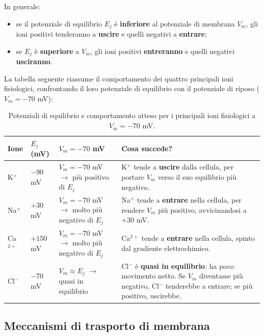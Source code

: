 \documentclass[12pt,a4paper,openany]{book}
\begin{document}
In generale:
\begin{itemize}
  \item se il potenziale di equilibrio $E_j$ è \textbf{inferiore} al potenziale
    di membrana $V_m$, gli ioni positivi tenderanno a \textbf{uscire} e quelli
    negativi a \textbf{entrare};
  \item se $E_j$ è \textbf{superiore} a $V_m$, gli ioni positivi
    \textbf{entreranno} e quelli negativi \textbf{usciranno}.
\end{itemize}

La tabella seguente riassume il comportamento dei quattro principali ioni
fisiologici, confrontando il loro potenziale di equilibrio con il potenziale
di riposo ($V_m = -70$ mV):

\begin{table}[H]
\centering
\renewcommand{\arraystretch}{1.5}
\begin{tabular}{p{2.5cm} p{2.5cm} p{2.5cm} p{6cm}}
\toprule
\textbf{Ione} & \textbf{$E_j$ (mV)} & \textbf{$V_m = -70$ mV} & \textbf{Cosa succede?} \\
\midrule
K$^+$ & $-90$ mV & $V_m = -70$ mV $\rightarrow$ più positivo di $E_j$ & 
K$^+$ tende a \textbf{uscire} dalla cellula, per portare $V_m$ verso il suo equilibrio più negativo. \\
\midrule
Na$^+$ & $+30$ mV & $V_m = -70$ mV $\rightarrow$ molto più negativo di $E_j$ & 
Na$^+$ tende a \textbf{entrare} nella cellula, per rendere $V_m$ più positivo, avvicinandosi a $+30$ mV. \\
\midrule
Ca$^{2+}$ & $+150$ mV & $V_m = -70$ mV $\rightarrow$ molto più negativo di $E_j$ & 
Ca$^{2+}$ tende a \textbf{entrare} nella cellula, spinto dal gradiente elettrochimico. \\
\midrule
Cl$^-$ & $-70$ mV & $V_m \approx E_j$ $\rightarrow$ quasi in equilibrio & 
Cl$^-$ è \textbf{quasi in equilibrio}: ha poco movimento netto. Se $V_m$ diventasse più negativo, Cl$^-$ tenderebbe a entrare; se più positivo, uscirebbe. \\
\bottomrule
\end{tabular}
\caption{Potenziali di equilibrio e comportamento atteso per i principali ioni
fisiologici a $V_m = -70$ mV.}
\end{table}

\subsection{Meccanismi di trasporto di membrana}
\end{document}
